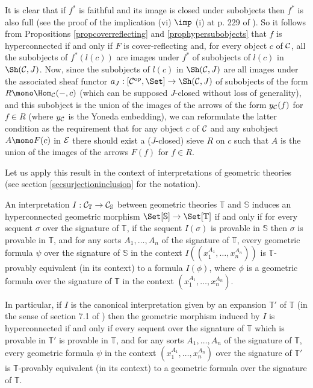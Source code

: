 \documentclass[a4paper,12pt]{article}
\begin{document}
\begin{proofs}
	It is clear that if $f^{\ast}$ is faithful and its image is closed under subobjects then $f^{\ast}$ is also full (see the proof of the implication  (vi) $\imp$ (i) at p. 229 of \cite{El}). So it follows from Propositions \ref{propcoverreflecting} and  \ref{prophypersubobjects} that $f$ is hyperconnected if and only if $F$ is cover-reflecting and, for every object $c$ of $\cal C$, all the subobjects of $f^{\ast}(l(c))$ are images under $f^{\ast}$ of subobjects of $l(c)$ in $\Sh({\cal C}, J)$. Now, since the subobjects of $l(c)$ in $\Sh({\cal C}, J)$ are all images under the associated sheaf functor $a_{J}:[{\cal C}^{\textup{op}}, \Set] \to \Sh({\cal C}, J) $ of subobjects of the form $R \mono \Hom_{\cal C}(-,c)$ (which can be supposed $J$-closed without loss of generality), and this subobject is the union of the images of the arrows of the form $y_{\cal C}(f)$ for $f\in R$ (where $y_{\cal C}$ is the Yoneda embedding), we can reformulate the latter condition as the requirement that for any object $c$ of $\cal C$ and any subobject $A\mono F(c)$ in $\cal E$ there should exist a ($J$-closed) sieve $R$ on $c$ such that $A$ is the union of the images of the arrows $F(f)$ for $f\in R$.  
\end{proofs}

Let us apply this result in the context of interpretations of geometric theories (see section \ref{secsurjectioninclusion} for the notation).

\begin{corollary}\label{corsyntactichyperconnected}
An interpretation $I:{\cal C}_{\mathbb T}\to {\cal C}_{\mathbb S}$ between geometric theories $\mathbb T$ and $\mathbb S$ induces an hyperconnected geometric morphism $\Set[{\mathbb S}]\to \Set[{\mathbb T}]$ if and only if for every sequent $\sigma$ over the signature of $\mathbb T$, if the sequent $I(\sigma)$ is provable in $\mathbb S$ then $\sigma$ is provable in $\mathbb T$, and for any sorts $A_{1}, \ldots, A_{n}$ of the signature of $\mathbb T$, every geometric formula $\psi$ over the signature of $\mathbb S$ in the context $I((x_{1}^{A_{1}}, \ldots, x_{n}^{A_{n}}))$ is $\mathbb T$-provably equivalent (in its context) to a formula $I(\phi)$, where $\phi$ is a geometric formula over the signature of $\mathbb T$ in the context $(x_{1}^{A_{1}}, \ldots, x_{n}^{A_{n}})$. 	

In particular, if $I$ is the canonical interpretation given by an expansion ${\mathbb T}'$ of ${\mathbb T}$ (in the sense of section 7.1 of \cite{OCBook}) then the geometric morphism induced by $I$ is hyperconnected if and only if every sequent over the signature of $\mathbb T$ which is provable in ${\mathbb T}'$ is provable in $\mathbb T$, and for any sorts $A_{1}, \ldots, A_{n}$ of the signature of $\mathbb T$, every geometric formula $\psi$ in the context $(x_{1}^{A_{1}}, \ldots, x_{n}^{A_{n}})$ over the signature of ${\mathbb T}'$ is $\mathbb T$-provably equivalent (in its context) to a geometric formula over the signature of $\mathbb T$.
\end{corollary}
\end{document}
